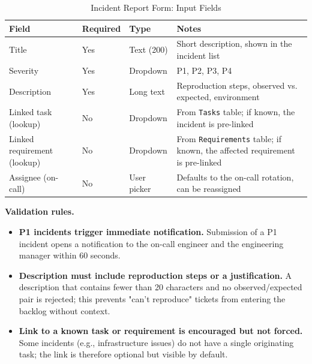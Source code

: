 \documentclass[12pt,a4paper]{report}
\begin{document}
\begin{table}[H]
\centering
\caption{Incident Report Form: Input Fields}
\small
\renewcommand{\arraystretch}{1.30}
\setlength{\tabcolsep}{6pt}
\begin{tabularx}{\textwidth}{>{\raggedright\arraybackslash}p{3.6cm}
                                >{\raggedright\arraybackslash}p{1.6cm}
                                >{\raggedright\arraybackslash}p{2.4cm}
                                >{\raggedright\arraybackslash}X}
\toprule
\textbf{Field} & \textbf{Required} & \textbf{Type} & \textbf{Notes} \\
\midrule
Title                       & Yes & Text (200)  & Short description, shown in the incident list \\
Severity                    & Yes & Dropdown    & P1, P2, P3, P4 \\
Description                 & Yes & Long text   & Reproduction steps, observed vs. expected, environment \\
Linked task (lookup)         & No  & Dropdown    & From \texttt{Tasks} table; if known, the incident is pre-linked \\
Linked requirement (lookup)  & No  & Dropdown    & From \texttt{Requirements} table; if known, the affected requirement is pre-linked \\
Assignee (on-call)           & No  & User picker & Defaults to the on-call rotation, can be reassigned \\
\bottomrule
\end{tabularx}
\end{table}

\textbf{Validation rules.}
\begin{itemize}[leftmargin=1.6em]
    \item \textbf{P1 incidents trigger immediate notification.} Submission of
          a P1 incident opens a notification to the on-call engineer and the
          engineering manager within 60 seconds.
    \item \textbf{Description must include reproduction steps or a
          justification.} A description that contains fewer than 20
          characters and no observed/expected pair is rejected; this
          prevents "can't reproduce" tickets from entering the backlog
          without context.
    \item \textbf{Link to a known task or requirement is encouraged but not
          forced.} Some incidents (e.g., infrastructure issues) do not
          have a single originating task; the link is therefore optional
          but visible by default.
\end{itemize}
\end{document}
